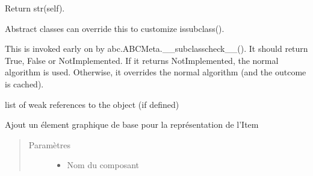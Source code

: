 \documentclass[a4paper,10pt,french]{sphinxmanual}
\begin{document}
\begin{fulllineitems}
\begin{fulllineitems}
\end{fulllineitems}


\begin{fulllineitems}
\label{\detokenize{road_objects/graphical_item:road_objects.graphical_item.GraphicalItem.__str__}}
Return str(self).

\end{fulllineitems}


\begin{fulllineitems}
\label{\detokenize{road_objects/graphical_item:road_objects.graphical_item.GraphicalItem.__subclasshook__}}
Abstract classes can override this to customize issubclass().

This is invoked early on by abc.ABCMeta.\_\_subclasscheck\_\_().
It should return True, False or NotImplemented.  If it returns
NotImplemented, the normal algorithm is used.  Otherwise, it
overrides the normal algorithm (and the outcome is cached).

\end{fulllineitems}


\begin{fulllineitems}
\label{\detokenize{road_objects/graphical_item:road_objects.graphical_item.GraphicalItem.__weakref__}}
list of weak references to the object (if defined)

\end{fulllineitems}


\begin{fulllineitems}
\label{\detokenize{road_objects/graphical_item:road_objects.graphical_item.GraphicalItem.add_component}}
Ajout un élement graphique de base pour la représentation de l’Item
\begin{quote}\begin{description}
\item[{Paramètres}] \leavevmode\begin{itemize}
\item {} 
 \textendash{} Nom du composant


\end{itemize}
\end{description}
\end{quote}
\end{fulllineitems}
\end{fulllineitems}
\end{document}
